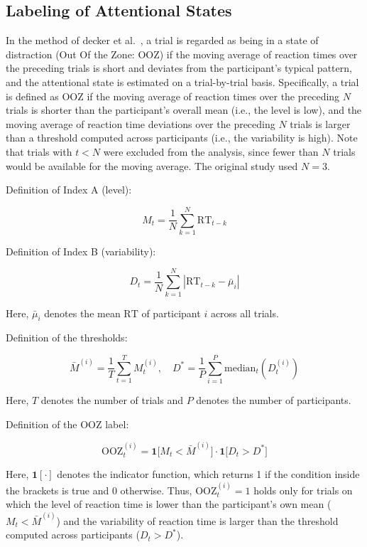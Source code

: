 \documentclass[dvipdfmx]{article}
\begin{document}
\subsection{Labeling of Attentional States}\label{sec:attention_labeling}
In the method of decker et al.~\cite{decker2023pay}, a trial is regarded as being in a state of distraction (Out Of the Zone: OOZ) if the moving average of reaction times over the preceding trials is short and deviates from the participant's typical pattern, and the attentional state is estimated on a trial-by-trial basis.
Specifically, a trial is defined as OOZ if the moving average of reaction times over the preceding $N$ trials is shorter than the participant's overall mean (i.e., the level is low),
and the moving average of reaction time deviations over the preceding $N$ trials is larger than a threshold computed across participants (i.e., the variability is high).
Note that trials with $t < N$ were excluded from the analysis, since fewer than $N$ trials would be available for the moving average.
The original study used $N=3$.



Definition of Index A (level):

$$M_t = \frac{1}{N}\sum_{k=1}^{N} \text{RT}_{t-k}$$

Definition of Index B (variability):

$$D_t = \frac{1}{N}\sum_{k=1}^{N} \left|\text{RT}_{t-k} - \bar{\mu}_i\right|$$

Here, $\bar{\mu}_i$ denotes the mean $\text{RT}$ of participant $i$ across all trials.

Definition of the thresholds:

$$\bar{M}^{(i)} = \frac{1}{T}\sum_{t=1}^T M_t^{(i)}, \quad D^* = \frac{1}{P}\sum_{i=1}^P \text{median}_t\left(D_t^{(i)}\right)$$

Here, $T$ denotes the number of trials and $P$ denotes the number of participants.

Definition of the OOZ label:

$$\text{OOZ}_{t}^{(i)} = \mathbf{1}\big[ M_t < \bar{M}^{(i)}\big] \cdot \mathbf{1}\big[D_t > D^*\big]$$

Here, $\mathbf{1}[\cdot]$ denotes the indicator function, which returns 1 if the condition inside the brackets is true and 0 otherwise.
Thus, $\text{OOZ}_{t}^{(i)} = 1$ holds only for trials on which the level of reaction time is lower than the participant's own mean ($M_t < \bar{M}^{(i)}$) and the variability of reaction time is larger than the threshold computed across participants ($D_t > D^*$).
\end{document}
